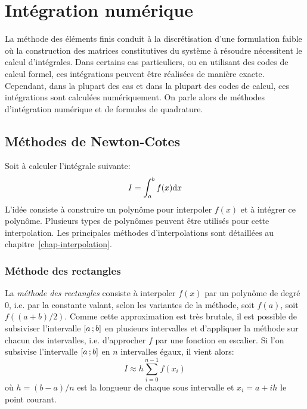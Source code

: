\chapter{Intégration numérique}\label{chap-quadrature} 
La méthode des éléments finis conduit à la discrétisation d'une formulation faible où la construction des matrices constitutives du système à résoudre nécessitent le calcul d'intégrales. Dans certains cas particuliers, ou en utilisant des codes de calcul formel, ces intégrations peuvent être réalisées de manière exacte. Cependant, dans la plupart des cas et dans la plupart des codes de calcul, ces intégrations sont calculées numériquement. On parle alors de méthodes d'intégration numérique et de formules de quadrature. 
\section{Méthodes de Newton-Cotes}
Soit à calculer l'intégrale suivante: 
\begin{equation}
I=\int_a^b f(x)\text{d} x
\end{equation}
L'idée consiste à construire un polynôme pour interpoler $f(x)$ et à intégrer ce polynôme. Plusieurs types de polynômes peuvent être utilisés pour cette interpolation. Les principales méthodes d'interpolations sont détaillées au chapitre~\ref{chap-interpolation}. 
\subsection{Méthode des rectangles}
La \emph{méthode des rectangles} consiste à interpoler $f(x)$ par un polynôme de degré $0$, i.e. par la constante valant, selon les variantes de la méthode, soit $f(a)$, soit $f((a+b)/2)$. Comme cette approximation est très brutale, il est possible de subsiviser l'intervalle $\mathopen{[}a\,;b\mathclose{]}$ en plusieurs intervalles et d'appliquer la méthode sur chacun des intervalles, i.e. d'approcher $f$ par une fonction en escalier. Si l'on subsivise l'intervalle $\mathopen{[}a\,;b\mathclose{]}$ en $n$ intervalles égaux, il vient alors: 
\begin{equation}
I\approx h\sum_{i=0}^{n-1} f(x_i)
\end{equation}
où $h=(b-a)/n$ est la longueur de chaque sous intervalle et $x_i=a+ih$ le point courant. 
